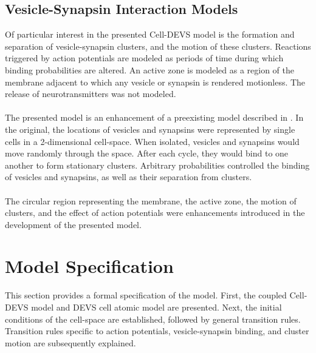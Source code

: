 \documentclass{acm_proc_article-sp}
\begin{document}
\subsection{Vesicle-Synapsin Interaction Models}
Of particular interest in the presented Cell-DEVS model 
is the formation and separation of vesicle-synapsin clusters,
and the motion of these clusters.  Reactions triggered
by action potentials are modeled as periods of time
during which binding probabilities are altered.  An active
zone is modeled as a region of the membrane adjacent to
which any vesicle or synapsin is rendered motionless.
The release of neurotransmitters was not modeled. \\
\\
The presented model is an enhancement of a preexisting
model described in 
\cite{Wainer:Advanced_DEVS_with_application_to_biomedicine}.
In the original, the locations of vesicles 
and synapsins were represented by single cells in
a 2-dimensional cell-space.  When isolated,
vesicles and synapsins would move randomly through
the space.  After each cycle, they would bind to one
another to form stationary clusters.  Arbitrary 
probabilities controlled the binding of vesicles
and synapsins, as well as their separation from
clusters. \\
\\
The circular region representing the membrane, the
active zone, the motion of clusters, and the effect
of action potentials were enhancements introduced 
in the development of the presented model.

\section{Model Specification} \label{Specification}
This section provides a formal specification of the model.  First, 
the coupled Cell-DEVS model and DEVS cell atomic model are 
presented.  Next, the initial conditions of the cell-space are
established, followed by general transition rules.  Transition
rules specific to action potentials, vesicle-synapsin binding,
and cluster motion are subsequently explained. 
\end{document}
